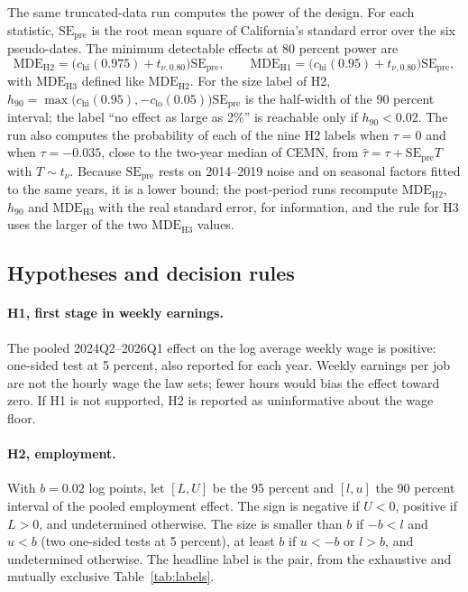The same truncated-data run computes the power of the design. For each statistic, $\mathrm{SE}_{\mathrm{pre}}$
is the root mean square of California's standard error over the six pseudo-dates. The minimum
detectable effects at 80 percent power are
\begin{equation}
\mathrm{MDE}_{\mathrm{H2}} = \bigl(c_{\mathrm{hi}}(0.975) + t_{\nu,0.80}\bigr)\mathrm{SE}_{\mathrm{pre}},
\qquad
\mathrm{MDE}_{\mathrm{H1}} = \bigl(c_{\mathrm{hi}}(0.95) + t_{\nu,0.80}\bigr)\mathrm{SE}_{\mathrm{pre}},
\end{equation}
with $\mathrm{MDE}_{\mathrm{H3}}$ defined like $\mathrm{MDE}_{\mathrm{H2}}$. For the size label of H2,
$h_{90} = \max\bigl(c_{\mathrm{hi}}(0.95), -c_{\mathrm{lo}}(0.05)\bigr)\mathrm{SE}_{\mathrm{pre}}$ is the
half-width of the 90 percent interval; the label ``no effect as large as 2\%'' is reachable only if
$h_{90} < 0.02$. The run also computes the probability of each of the nine H2 labels when
$\tau = 0$ and when $\tau = -0.035$, close to the two-year median of CEMN, from
$\hat\tau = \tau + \mathrm{SE}_{\mathrm{pre}}T$ with $T \sim t_\nu$. Because $\mathrm{SE}_{\mathrm{pre}}$
rests on 2014--2019 noise and on seasonal factors fitted to the same years, it is a lower bound; the
post-period runs recompute $\mathrm{MDE}_{\mathrm{H2}}$, $h_{90}$ and $\mathrm{MDE}_{\mathrm{H3}}$ with
the real standard error, for information, and the rule for H3 uses the larger of the two
$\mathrm{MDE}_{\mathrm{H3}}$ values.

\subsection{Hypotheses and decision rules}
\label{sec:decision}

\paragraph{H1, first stage in weekly earnings.} The pooled 2024Q2--2026Q1 effect on the log average
weekly wage is positive: one-sided test at 5 percent, also reported for each year. Weekly earnings
per job are not the hourly wage the law sets; fewer hours would bias the effect toward zero. If H1
is not supported, H2 is reported as uninformative about the wage floor.

\paragraph{H2, employment.} With $b = 0.02$ log points, let $[L, U]$ be the 95 percent and
$[l, u]$ the 90 percent interval of the pooled employment effect. The sign is negative if $U < 0$,
positive if $L > 0$, and undetermined otherwise. The size is smaller than $b$ if $-b < l$ and
$u < b$ (two one-sided tests at 5 percent), at least $b$ if $u < -b$ or $l > b$, and undetermined
otherwise. The headline label is the pair, from the exhaustive and mutually exclusive
Table~\ref{tab:labels}.

